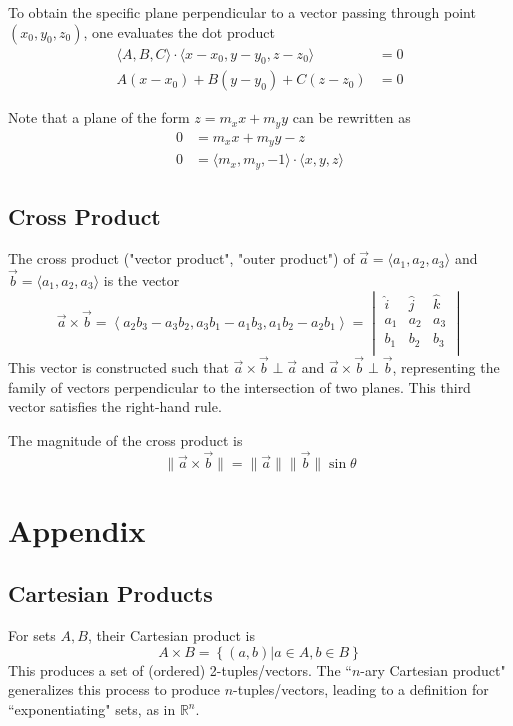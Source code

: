 \documentclass{article}
\newcommand{\vect}[1]{\ensuremath{\overrightarrow{#1}}}
\newcommand{\magnitude}[1]{\ensuremath{\lVert #1 \rVert}}
\newcommand{\magvect}[1]{\magnitude{\vect{#1}}}
\begin{document}
To obtain the specific plane perpendicular to a vector passing through point $(x_0, y_0, z_0)$, one evaluates the dot product
\begin{align*}
    \langle A, B, C \rangle \cdot \langle x - x_0, y - y_0, z - z_0 \rangle &= 0 \\
    A\left(x - x_0\right) + B\left(y - y_0\right) + C\left(z - z_0\right) &= 0
\end{align*}

Note that a plane of the form $z = m_xx + m_yy$ can be rewritten as
\begin{align*}
    0 &= m_xx + m_yy - z \\
    0 &= \langle m_x, m_y, -1 \rangle \cdot \langle x, y, z \rangle
\end{align*}

\subsection{Cross Product}
The cross product ("vector product", "outer product") of $\vect{a} = \langle a_1, a_2, a_3 \rangle$ and $\vect{b} = \langle a_1, a_2, a_3 \rangle$ is the vector
$$\vect{a} \times \vect{b} = \left\langle a_2b_3 - a_3b_2, a_3b_1 - a_1b_3, a_1b_2 - a_2b_1\right\rangle =
    \begin{vmatrix}
        \hat{i} & \hat{j} & \hat{k} \\
        a_1     & a_2     & a_3     \\
        b_1     & b_2     & b_3     \\
    \end{vmatrix}
$$
This vector is constructed such that $\vect{a} \times \vect{b} \perp \vect{a}$ and $\vect{a} \times \vect{b} \perp \vect{b}$, representing the family of vectors perpendicular to the intersection of two planes. This third vector satisfies the right-hand rule.

The magnitude of the cross product is
$$\magnitude{\vect{a} \times \vect{b}} = \magvect{a}\magvect{b}\sin{\theta}$$

\section{Appendix}
\subsection{Cartesian Products} \label{set-multiplication}
For sets $A, B$, their Cartesian product is $$A \times B = \left\{ (a,b) | a \in A, b \in B\right\}$$
This produces a set of (ordered) 2-tuples/vectors.
The ``$n$-ary Cartesian product" generalizes this process to produce $n$-tuples/vectors, leading to a definition for ``exponentiating" sets, as in $\mathbb{R}^n$.
\end{document}

